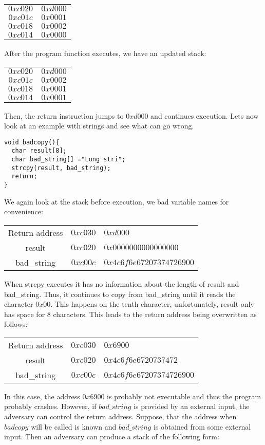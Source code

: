 \documentclass{article}
\begin{document}
\begin{tabular}{c|c}
$0xc020$ & $0xd000$\\
$0xc01c$ & $0x0001$\\
$0xc018$ & $0x0002$\\
$0xc014$ & $0x0000$
\end{tabular}

After the program function executes, we have an updated stack:

\begin{tabular}{c|c}
$0xc020$ & $0xd000$\\
$0xc01c$ & $0x0002$\\
$0xc018$ & $0x0001$\\
$0xc014$ & $0x0001$
\end{tabular}

Then, the return instruction jumps to $0xd000$ and continues execution.  Lets now look at an example with strings and see what can go wrong.
\begin{lstlisting}
void badcopy(){
  char result[8];
  char bad_string[] ="Long stri";
  strcpy(result, bad_string);
  return;
}
\end{lstlisting}
We again look at the stack before execution, we bad variable names for convenience:

\begin{tabular}{c|c|l}
Return address & $0xc030$ & $0xd000$\\
result & $0xc020$ & $0x0000000000000000$\\
bad\_string & $0xc00c$ & $0x4c6f6e67207374726900$\\
\end{tabular}

When strcpy executes it has no information about the length of result and bad\_string.  Thus, it continues to copy from bad\_string until it reads the character $0x00$.  This happens on the tenth character, unfortunately, result only has space for 8 characters.  This leads to the return address being overwritten as follows:

\begin{tabular}{c|c|l}
Return address & $0xc030$ & $0x6900$\\
result & $0xc020$ & $0x4c6f6e6720737472$\\
bad\_string & $0xc00c$ & $0x4c6f6e67207374726900$\\
\end{tabular}

In this case, the address $0x6900$ is probably not executable and thus the program probably crashes.  However, if $bad\_string$ is provided by an external input, the adversary can control the return address.  Suppose, that the address when $badcopy$ will be called is known and $bad\_string$ is obtained from some external input.  Then an adversary can produce a stack of the following form:
\end{document}
